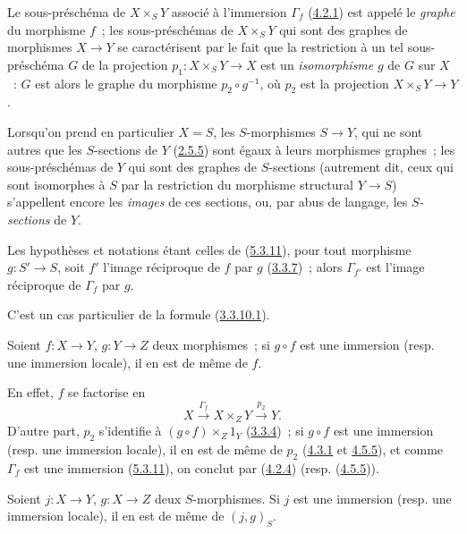 Le sous-préschéma de $X\times_S Y$ associé à l'immersion $\Gamma_f$
(\hyperref[I.4.2.1-fr]{4.2.1}) est appelé le \emph{graphe} du morphisme $f$~;
les sous-préschémas de $X\times_S Y$ qui sont des graphes de morphismes
$X\to Y$ se caractérisent par le fait que la restriction à un tel
sous-préschéma $G$ de la projection $p_1:X\times_S Y\to X$ est un
\emph{isomorphisme} $g$ de $G$ sur $X$~: $G$ est alors le graphe du morphisme
$p_2\circ g^{-1}$, où $p_2$ est la projection $X\times_S Y\to Y$.

Lorsqu'on prend en particulier $X=S$, les $S$-morphismes $S\to Y$, qui ne
sont autres que les $S$-sections de $Y$ (\hyperref[I.2.5.5-fr]{2.5.5}) sont
égaux à leurs morphismes graphes~; les sous-préschémas de $Y$ qui sont des
graphes de $S$-sections (autrement dit, ceux qui sont isomorphes à $S$ par la
restriction du morphisme structural $Y\to S$) s'appellent encore les
\emph{images} de ces sections, ou, par abus de langage, les
\emph{$S$-sections} de $Y$.

\begin{corollary}[5.3.12]
\label{I.5.3.12-fr}
Les hypothèses et notations étant celles de
(\hyperref[I.5.3.11-fr]{5.3.11}), pour tout morphisme $g:S'\to S$, soit $f'$
l'image réciproque de $f$ par $g$ (\hyperref[I.3.3.7-fr]{3.3.7})~; alors
$\Gamma_{f'}$ est l'image réciproque de $\Gamma_f$ par $g$.
\end{corollary}

C'est un cas particulier de la formule
(\hyperref[I.3.3.10.1-fr]{3.3.10.1}).

\begin{corollary}[5.3.13]
\label{I.5.3.13-fr}
Soient $f:X\to Y$, $g:Y\to Z$ deux morphismes~; si $g\circ f$ est une
immersion (resp. une immersion locale), il en est de même de $f$.
\end{corollary}

En effet, $f$ se factorise en
\[
  X\xrightarrow{\Gamma_f}X\times_Z Y\xrightarrow{p_2}Y.
\]
D'autre part, $p_2$ s'identifie à $(g\circ f)\times_Z 1_Y$
(\hyperref[I.3.3.4-fr]{3.3.4})~; si $g\circ f$ est une immersion (resp. une
immersion locale), il en est de même de $p_2$
(\hyperref[I.4.3.1-fr]{4.3.1} et \hyperref[I.4.5.5-fr]{4.5.5}), et comme
$\Gamma_f$ est une immersion (\hyperref[I.5.3.11-fr]{5.3.11}), on conclut
par (\hyperref[I.4.2.4-fr]{4.2.4}) (resp.
(\hyperref[I.4.5.5-fr]{4.5.5})).

\begin{corollary}[5.3.14]
\label{I.5.3.14-fr}
Soient $j:X\to Y$, $g:X\to Z$ deux $S$-morphismes. Si $j$ est une immersion
(resp. une immersion locale), il en est de même de $(j,g)_S$.
\end{corollary}

